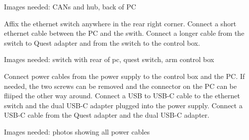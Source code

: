 \begin{tipbox}
    Images needed: CANs and hub, back of PC
\end{tipbox}

Affix the ethernet switch anywhere in the rear right corner. Connect a short ethernet cable between the PC and the swith. Connect a longer cable from the switch to Quest adapter and from the switch to the control box.

\begin{tipbox}
    Images needed: switch with rear of pc, quest switch, arm control box
\end{tipbox}

Connect power cables from the power supply to the control box and the PC. If needed, the two screws can be removed and the connector on the PC can be fliiped the other way around. Connect a USB to USB-C cable to the ethernet switch and the dual USB-C adapter plugged into the power supply. Connect a USB-C cable from the Quest adapter and the dual USB-C adapter. 

\begin{tipbox}
    Images needed: photos showing all power cables
\end{tipbox}


